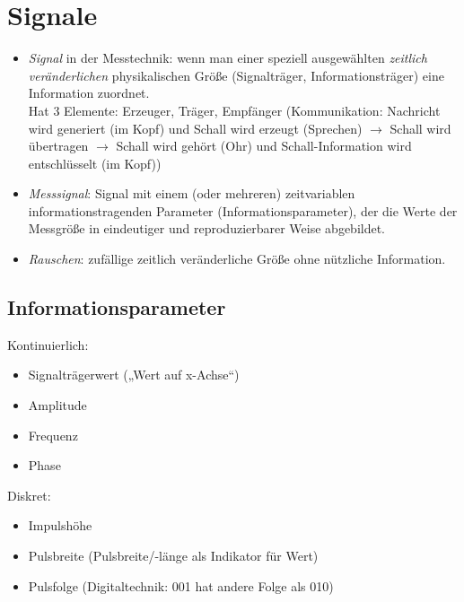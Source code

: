 \section{Signale}
\begin{itemize}
\item \emph{Signal} in der Messtechnik: wenn man einer speziell ausgewählten \emph{zeitlich veränderlichen} physikalischen Größe (Signalträger, Informationsträger) eine Information zuordnet. \\
Hat 3 Elemente: Erzeuger, Träger, Empfänger (Kommunikation: Nachricht wird generiert (im Kopf) und Schall wird erzeugt (Sprechen) $\to$ Schall wird übertragen $\to$ Schall wird gehört (Ohr) und Schall-Information wird entschlüsselt (im Kopf))
\item \emph{Messsignal}: Signal mit einem (oder mehreren) zeitvariablen informationstragenden Parameter (Informationsparameter), der die Werte der Messgröße in eindeutiger und reproduzierbarer Weise abgebildet.
\item \emph{Rauschen}: zufällige zeitlich veränderliche Größe ohne nützliche Information.
\end{itemize}

\subsection{Informationsparameter}
Kontinuierlich:
\begin{itemize}
\item Signalträgerwert („Wert auf x-Achse“)
\item Amplitude
\item Frequenz
\item Phase
\end{itemize}
Diskret:
\begin{itemize}
\item Impulshöhe
\item Pulsbreite (Pulsbreite/-länge als Indikator für Wert)
\item Pulsfolge (Digitaltechnik: 001 hat andere Folge als 010)
\end{itemize}

